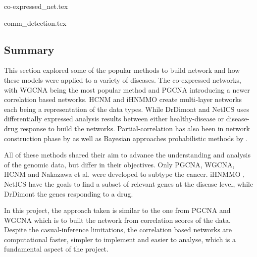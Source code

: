 {co-expressed_net.tex}

{comm_detection.tex}


\subsection{Summary} 

This section explored some of the popular methods to build network and how these models were applied to a variety of diseases. The co-expressed networks, with WGCNA \cite{Langfelder2008-sn} being the most popular method and PGCNA \cite{Care2019-ij} introducing a newer correlation based networks. HCNM \cite{Vangimalla2021-fc} and iHNMMO \citet{Peng2017-ik} create multi-layer networks each being a representation of the data types. While DrDimont \cite{Hiort2022-lk} and NetICS \citet{Dimitrakopoulos2018-br} uses differentially expressed analysis results between either healthy-disease or disease-drug response to build the networks. Partial-correlation has also been in network construction phase by \citet{De_la_Fuente2004-ts} as well as Bayesian approaches  probabilistic methods by \cite{Nakazawa2021-yq, Tamada2011-ok, Tanaka2020-mw}.

All of these methods shared their aim to advance the understanding and analysis of the genomic data, but differ in their objectives. Only PGCNA, WGCNA, HCNM and Nakazawa et al.\cite{Care2019-ij, Langfelder2008-sn, Nakazawa2021-yq,  Vangimalla2021-fc} were developed to subtype the cancer. iHNMMO \cite{Peng2017-ik}, NetICS \cite{Dimitrakopoulos2018-br} have the goals to find a subset of relevant genes at the disease level, while DrDimont \cite{Hiort2022-lk} the genes responding to a drug. 

In this project, the approach taken is similar to the one from PGCNA and WGCNA which is to built the network from correlation scores of the data. Despite the casual-inference limitations, the correlation based networks are computational faster, simpler to implement and easier to analyse, which is a fundamental aspect of the project.






